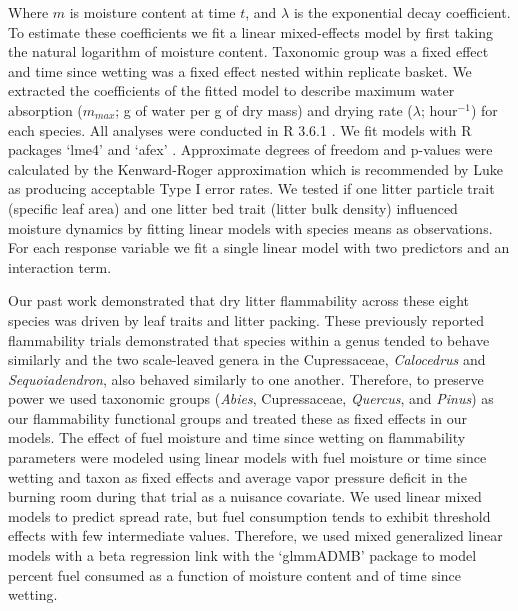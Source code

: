 \documentclass[letterpaper,12pt]{article}
\begin{document}
Where $m$ is moisture content at time $t$, and $\lambda$ is the exponential
decay coefficient. To estimate these coefficients we fit a linear mixed-effects
model by first taking the natural logarithm of moisture content. Taxonomic
group was a fixed effect and time since wetting was a fixed effect nested
within replicate basket. We extracted the coefficients of the fitted model to
describe maximum water absorption ($m_{max}$; g of water per g of dry mass)
and drying rate ($\lambda$; hour$^{-1}$) for each species. All analyses
were conducted in R 3.6.1 \citep{RCoreTeam-2019}. We fit models with R packages
`lme4' \citep{Bates_Machler_etal-2015} and `afex'
\citep{Singmann_Bolker_etal-2017}. Approximate degrees of freedom and p-values
were calculated by the Kenward-Roger approximation \citep{Kenward_Roger-1997}
which is recommended by Luke \citeyear{Luke-2017} as producing acceptable Type
I error rates. We tested if one litter particle trait (specific leaf area) and
one litter bed trait (litter bulk density) influenced moisture dynamics by
fitting linear models with species means as observations. For each response
variable we fit a single linear model with two predictors and an interaction
term.

Our past work \citep{Magalhaes+Schwilk-2012} demonstrated that dry litter
flammability across these eight species was driven by leaf traits and litter
packing. These previously reported flammability trials demonstrated that
species within a genus tended to behave similarly and the two scale-leaved
genera in the Cupressaceae, \emph{Calocedrus} and \emph{Sequoiadendron}, also
behaved similarly to one another. Therefore, to preserve power we used
taxonomic groups (\emph{Abies}, Cupressaceae, \emph{Quercus}, and \emph{Pinus})
as our flammability functional groups and treated these as fixed effects in our
models. The effect of fuel moisture and time since wetting on flammability
parameters were modeled using linear models with fuel moisture or time since
wetting and taxon as fixed effects and average vapor pressure deficit in the
burning room during that trial as a nuisance covariate. We used linear mixed
models to predict spread rate, but fuel consumption tends to exhibit threshold
effects with few intermediate values. Therefore, we used mixed generalized
linear models with a beta regression link with the `glmmADMB' package
\citep{Skaug_Fournier_etal-2016} to model percent fuel consumed as a function
of moisture content and of time since wetting.
\end{document}

